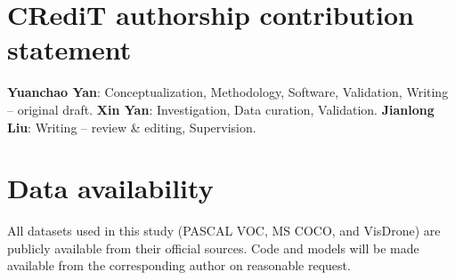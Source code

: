 \documentclass[3p]{elsarticle}
\begin{document}
\section*{CRediT authorship contribution statement}
\textbf{Yuanchao Yan}: Conceptualization, Methodology, Software, Validation, Writing -- original draft. \textbf{Xin Yan}: Investigation, Data curation, Validation. \textbf{Jianlong Liu}: Writing -- review \& editing, Supervision.

\section*{Data availability}
All datasets used in this study (PASCAL VOC, MS COCO, and VisDrone) are publicly available from their official sources. Code and models will be made available from the corresponding author on reasonable request.


\enlargethispage{3\baselineskip}


\end{document}
